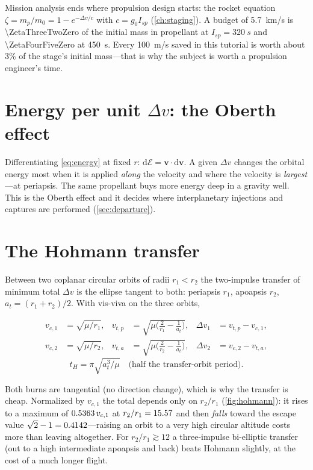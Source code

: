\documentclass[11pt,letterpaper,oneside]{report}
\newcommand{\dv}{\Delta v}
\newcommand{\En}{\mathcal E}
\newcommand{\Isp}{{I_{sp}}}
\newcommand{\gz}{g_0}
\newcommand{\dd}{\mathrm{d}}
\newcommand{\bv}[1]{\bm{#1}}
\begin{document}
\begin{propulsion}
Mission analysis ends where propulsion design starts: the rocket equation $\zeta=m_p/m_0=1-e^{-\dv/c}$
with $c=\gz\Isp$ (\cref{ch:staging}). A budget of \SI{5.7}{km/s} is \SI{\ZetaThreeTwoZero}{} of the
initial mass in propellant at $\Isp=\SI{320}{s}$ and \SI{\ZetaFourFiveZero}{} at \SI{450}{s}. Every
\SI{100}{m/s} saved in this tutorial is worth about 3\% of the stage's initial mass---that is
why the subject is worth a propulsion engineer's time.
\end{propulsion}

\section{Energy per unit \texorpdfstring{$\dv$}{dv}: the Oberth effect}
Differentiating \cref{eq:energy} at fixed $r$: $\dd\En=\bv v\cdot\dd\bv v$. A given $\dv$ changes
the orbital energy most when it is applied \emph{along} the velocity and where the velocity is
\emph{largest}---at periapsis. The same propellant buys more energy deep in a gravity well. This
is the Oberth effect and it decides where interplanetary injections and captures are performed
(\cref{sec:departure}).

\section{The Hohmann transfer}
Between two coplanar circular orbits of radii $r_1<r_2$ the two-impulse transfer of minimum
total $\dv$ is the ellipse tangent to both: periapsis $r_1$, apoapsis $r_2$, $a_t=(r_1+r_2)/2$.
With vis-viva on the three orbits,
\begin{keyresult}
\begin{align}
  v_{c,1}&=\sqrt{\mu/r_1}, & v_{t,p}&=\sqrt{\mu\Big(\frac{2}{r_1}-\frac{1}{a_t}\Big)}, & \dv_1&=v_{t,p}-v_{c,1},\\
  v_{c,2}&=\sqrt{\mu/r_2}, & v_{t,a}&=\sqrt{\mu\Big(\frac{2}{r_2}-\frac{1}{a_t}\Big)}, & \dv_2&=v_{c,2}-v_{t,a},
\end{align}
\begin{equation}
  t_H=\pi\sqrt{a_t^3/\mu}\quad\text{(half the transfer-orbit period)}.
\end{equation}
\end{keyresult}
Both burns are tangential (no direction change), which is why the transfer is cheap. Normalized
by $v_{c,1}$ the total depends only on $r_2/r_1$ (\cref{fig:hohmann}): it rises to a maximum of
$0.5363\,v_{c,1}$ at $r_2/r_1=15.57$ and then \emph{falls} toward the escape value
$\sqrt2-1=0.4142$---raising an orbit to a very high circular altitude costs more than
leaving altogether. For $r_2/r_1\gtrsim 12$ a three-impulse bi-elliptic transfer (out to a high
intermediate apoapsis and back) beats Hohmann slightly, at the cost of a much longer flight.
\end{document}
